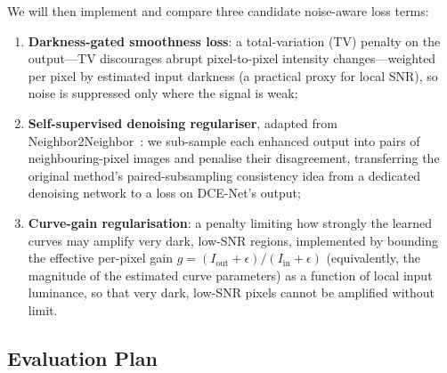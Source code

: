 \documentclass[11pt, letterpaper]{article}
\begin{document}
We will then implement and compare three candidate noise-aware loss terms:

\begin{enumerate}[noitemsep]
  \item \textbf{Darkness-gated smoothness loss}: a total-variation (TV) penalty on the output---TV discourages abrupt pixel-to-pixel intensity changes---weighted per pixel by estimated input darkness (a practical proxy for local SNR), so noise is suppressed only where the signal is weak;
  \item \textbf{Self-supervised denoising regulariser}, adapted from Neighbor2Neighbor~\cite{huang2021n2n}: we sub-sample each enhanced output into pairs of neighbouring-pixel images and penalise their disagreement, transferring the original method's paired-subsampling consistency idea from a dedicated denoising network to a loss on DCE-Net's output;
  \item \textbf{Curve-gain regularisation}: a penalty limiting how strongly the learned curves may amplify very dark, low-SNR regions, implemented by bounding the effective per-pixel gain $g = (I_{\text{out}} + \epsilon)/(I_{\text{in}} + \epsilon)$ (equivalently, the magnitude of the estimated curve parameters) as a function of local input luminance, so that very dark, low-SNR pixels cannot be amplified without limit.
\end{enumerate}

\subsection{Evaluation Plan}
\end{document}
